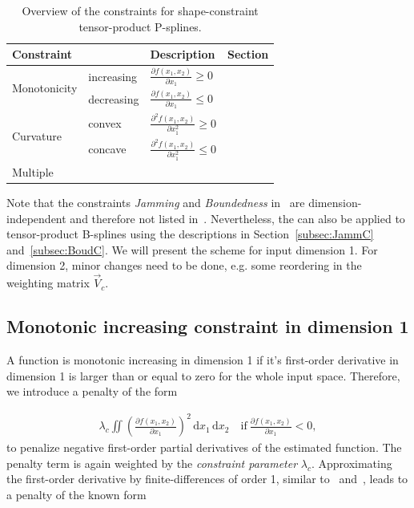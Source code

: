 \begin{table}[H]
	\centering
	\begin{tabular}{|l|ll|l|}
		\hline
		\textbf{Constraint}& & \textbf{Description}   & \textbf{Section}     \\ \hline \toprule
		\multirow{2}{*}{Monotonicity} & increasing & $ \frac{\partial f(x_1,x_2)}{\partial x_1} \ge 0$ 	& \pref{subsec:MIC-TP-one-dim} \\ \cline{2-4}
		& decreasing & $\frac{\partial f(x_1,x_2)}{\partial x_1} \le 0$  & \pref{subsec:MDC-TP-one-dim} \\ \hline	
		\multirow{2}{*}{Curvature}    & convex     & $\frac{\partial^2 f(x_1,x_2)}{\partial x_1^2}\ge 0$ 	& \pref{subsec:CONV-TP-one-dim} \\ \cline{2-4}
		& concave    & $\frac{\partial^2 f(x_1,x_2)}{\partial x_1^2}\le 0$ 	& \pref{subsec:CONC-TP-one-dim} \\ \hline 
		Multiple  & & & \pref{subsec:MULTICON-TP-one-dim} \\ \hline \bottomrule
	\end{tabular}
	\caption{Overview of the constraints for shape-constraint tensor-product P-splines.}
	\label{tab:constraint_overview_2d}
\end{table}

Note that the constraints \emph{Jamming} and \emph{Boundedness} in~ are dimension-independent and therefore not listed in~. Nevertheless, the can also be applied to tensor-product B-splines using the descriptions in Section~\ref{subsec:JammC} and~\ref{subsec:BoudC}. We will present the scheme for input dimension 1. For dimension 2, minor changes need to be done, e.g. some reordering in the weighting matrix $\vec{V}_c$. 

\subsection{Monotonic increasing constraint in dimension 1} \label{subsec:MIC-TP-one-dim}

A function is monotonic increasing in dimension 1 if it's first-order derivative in dimension 1 is larger than or equal to zero for the whole input space. Therefore, we introduce a penalty of the form

\begin{align} \label{eq:SCP-tp-penalty-base-from}
	\lambda_c \iint \left( \frac{\partial f(x_1, x_2)}{\partial x_1} \right)^2 \,\mathrm{d}x_1 \,\mathrm{d}x_2 \quad \text{if} \ \frac{\partial f(x_1, x_2)}{\partial x_1} < 0,
\end{align} 
%
to penalize negative first-order partial derivatives of the estimated function. The penalty term is again weighted by the \emph{constraint parameter} $\lambda_c$. Approximating the first-order derivative by finite-differences of order 1, similar to~ and~, leads to a penalty of the known form 

